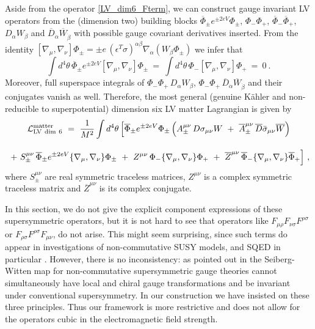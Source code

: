 \documentclass[12pt]{revtex4}
\begin{document}
Aside from the operator \eqref{LV_dim6_Fterm}, we can 
construct gauge invariant LV operators from the (dimension two)
building blocks  
$\overline{\Phi}_\pm e^{\pm 2e V} \Phi_\pm$, $\Phi_- \Phi_+$, 
$\overline{\Phi}_- \overline{\Phi}_+$, $D_\alpha W_\beta$ and
$\overline{D}_{\dot\alpha} \overline{W}_{\dot\beta}$ with possible
gauge covariant derivatives inserted. From the identity 
\(
[ \nabla_\mu, \nabla_\nu] \Phi_\pm = \pm e \, 
(\epsilon^T \sigma)^{\alpha\beta} \nabla_\alpha( W_\beta \Phi_\pm)
\)
we infer that 
%
\begin{equation}
\int d^4\theta\, \overline{\Phi}_\pm e^{\pm 2eV} 
[ \nabla_\mu, \nabla_\nu] \Phi_\pm  
~=~ \int d^4\theta\, \Phi_- [ \nabla_\mu, \nabla_\nu] \Phi_+ ~=~ 0~. 
\end{equation} 
%
Moreover, full superspace integrals of 
$\Phi_- \Phi_+\, D_\alpha W_\beta$, 
$\Phi_- \Phi_+\, \overline{D}_{\dot\alpha} \overline{W}_{\dot\beta}$ 
and their conjugates vanish as well. Therefore, the most general
(genuine K\"ahler and non-reducible to superpotential) dimension six
LV matter Lagrangian is given by  
%
\begin{gather}
{\cal L}_{\rm LV\ dim\ 6}^{\rm matter}  ~=~ \frac{1}{M^2}
\int d^4 \theta\, \Big[ 
\overline{\Phi}_\pm e^{\pm 2eV} \Phi_\pm \, 
\Big( 
A_\pm^{\mu\nu} \, D \sigma_{\mu\nu} W ~+~ 
\overline{A}_\pm^{\mu\nu} \, \overline{D} \bar\sigma_{\mu\nu} \overline{W}
\Big) 
\nonumber \\[2ex]
~+~ S_\pm^{\mu\nu}\,  \overline{\Phi}_\pm e^{\pm 2eV} 
\lbrace \nabla_\mu, \nabla_\nu \rbrace \Phi_\pm  
~+~ Z^{\mu\nu}\,  \Phi_- \lbrace \nabla_\mu, \nabla_\nu \rbrace \Phi_+ 
~+~ \overline{Z}^{\mu\nu}\,  
\overline{\Phi}_- \lbrace \nabla_\mu, \nabla_\nu \rbrace \overline{\Phi}_+ 
 \Big]~, 
 \label{LV_dim6_Dterm}
\end{gather}
%
where $S_\pm^{\mu\nu}$ are real symmetric traceless matrices, 
$Z^{\mu\nu}$ is a complex symmetric traceless matrix and
$\overline{Z}^{\mu\nu}$ is its complex conjugate. 


In this section, we do not give the explicit component expressions of
these supersymmetric operators, but it is not hard to see that
operators like  $ F_{\mu\rho}F_{\nu\sigma}F^{\rho\sigma} $
or $ F_{\rho\sigma}F^{\rho\sigma}F_{\mu\nu} $, 
do not arise. This might seem surprising, since such terms do appear
in investigations of non-commutative SUSY models, and SQED in
particular \cite{Putz:2002ib,Mikulovic:2003sq}. However, there is no
inconsistency: as pointed out in \cite{Mikulovic:2003sq} the
Seiberg-Witten map for non-commutative supersymmetric gauge 
theories cannot simultaneously have local and chiral gauge
transformations and be invariant under conventional supersymmetry. 
In our construction we have insisted on these three
principles. 
Thus our framework is more restrictive and does not allow 
for the operators cubic in the electromagnetic field strength.
\end{document}
